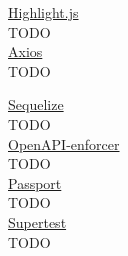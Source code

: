 \noindent\underline{Highlight.js}\\

TODO \\

\noindent\underline{Axios}\\

TODO \\


\noindent\underline{Sequelize}\\

TODO \\

\noindent\underline{OpenAPI-enforcer}\\

TODO \\


\noindent\underline{Passport}\\

TODO \\

\noindent\underline{Supertest}\\

TODO \\